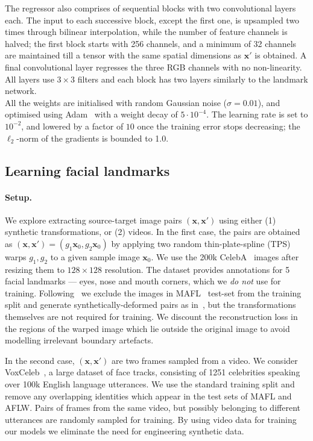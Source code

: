 \documentclass{article}
\newcommand{\bx}{\mathbf{x}}
\begin{document}
The regressor also comprises of sequential blocks with two convolutional layers each. The input to each successive block, except the first one, is upsampled two times through bilinear interpolation, while the number of feature channels is halved; the first block starts with 256 channels, and a minimum of 32 channels are maintained till a tensor with the same spatial dimensions as $\bx'$ is obtained. A final convolutional layer regresses the three RGB channels with no non-linearity. All layers use $3{\times}3$ filters and each block has two layers similarly to the landmark network.\\
All the weights are initialised with random Gaussian noise ($\sigma = 0.01$), and optimised using Adam~\citep{Kingma14} with a weight decay of $5\cdot10^{-4}$. The learning rate is set to $10^{-2}$, and lowered by a factor of $10$ once the training error stops decreasing; the $\ell_2$-norm of the gradients is bounded to 1.0.

\subsection{Learning facial landmarks}\label{s:facialkpt}\paragraph{Setup.}

We explore extracting source-target image pairs $(\bx,\bx')$ using either (1) synthetic transformations, or (2) videos. In the first case, the pairs are obtained as $(\bx, \bx')=(g_1\bx_0, g_2\bx_0)$ by applying two random thin-plate-spline (TPS)~\citep{duchon1977splines,wahba1990spline} warps $g_1,g_2$ to a given sample image $\bx_0$. We use the 200k CelebA~\citep{liu2015faceattributes} images after resizing them to $128{\times}128$ resolution. The dataset provides annotations for 5 facial landmarks --- eyes, nose and mouth corners, which we \emph{do not} use for training. Following~\cite{thewlis17unsupervised} we exclude the images in MAFL~\citep{Zhang2016} test-set from the training split and generate synthetically-deformed pairs as in~\citep{thewlis17unsupervised,zhang2018unsupervised}, but the transformations themselves are not required for training. We discount the reconstruction loss in the regions of  the warped image which lie outside the original image to avoid modelling irrelevant boundary artefacts.

In the second case, $(\bx,\bx')$ are two frames sampled from a video. We consider VoxCeleb~\citep{Nagrani17}, a large dataset of face tracks, consisting of 1251 celebrities speaking over 100k English language utterances. We use the standard training split and remove any overlapping identities which appear in the test sets of MAFL and AFLW. Pairs of frames from the same video, but possibly belonging to different utterances are randomly sampled for training. By using video data for training our models we eliminate the need for engineering synthetic data.
\end{document}
